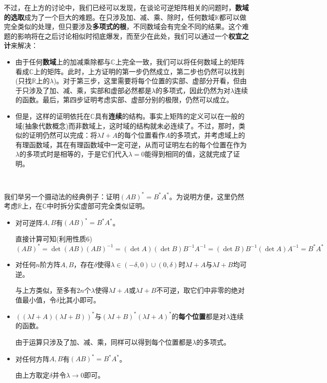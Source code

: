 \documentclass[a4paper,UTF8,fontset=windows]{ctexart}
\begin{document}
不过，在上方的讨论中，我们已经可以发现，在谈论可逆矩阵相关的问题时，\textbf{数域的选取}成为了一个巨大的难题。在只涉及加、减、乘、除时，任何数域$\mathbb{K}$都可以做完全类似的处理，但只要涉及\textbf{多项式的根}，不同数域会有完全不同的结果。这个难题的影响将在之后讨论相似时彻底爆发，而至少在此处，我们可以通过一个\textbf{权宜之计}来解决：
\begin{itemize}
    \item 由于任何\textbf{数域}上的加减乘除都与$\mathbb{C}$上完全一致，我们可以将任何数域上的矩阵看成$\mathbb{C}$上的矩阵。此时，上方证明的第一步仍然成立，第二步也仍然可以找到(只找$\mathbb{R}$上的$\lambda$)。对于第三步，这里需要将每个位置的实部、虚部分开看，但由于只涉及了加、减、乘，实部和虚部必然都是$\lambda$的多项式，因此仍然为对$\lambda$连续的函数。最后，第四步证明考虑实部、虚部分别的极限，仍然可以成立。

    \item 但是，这样的证明依托在$\mathbb{C}$具有\textbf{连续}的结构。事实上矩阵的定义可以在一般的域(抽象代数概念)而非数域上，这时域的结构就未必连续了。不过，那时，类似的证明仍然可以完成：将$\lambda I+A$的每个位置看作$A$的多项式，并考虑域上的有理函数域，其在有理函数域中一定可逆，从而可证明左右的每个位置在作为$\lambda$的多项式时是相等的，于是它们代入$\lambda=0$能得到相同的值，这就完成了证明。
\end{itemize}

\

我们举另一个摄动法的经典例子：证明$(AB)^*=B^*A^*$。为说明方便，这里仍然考虑$\mathbb{R}$上，在$\mathbb{C}$中时拆分实虚部可完全类似证明。

\begin{itemize}
    \item 对可逆阵$A,B$有$(AB)^*=B^*A^*$。
    
    直接计算可知(利用性质6)
    $$(AB)^*=\det(AB)(AB)^{-1}=(\det A)(\det B)B^{-1}A^{-1}=(\det B)B^{-1}(\det A)A^{-1}=B^*A^*$$

    \item 对任何$n$阶方阵$A,B$，存在$\delta$使得$\lambda\in(-\delta,0)\cup(0,\delta)$时$\lambda I+A$与$\lambda I+B$均可逆。
    
    与上方类似，至多有$2n$个$\lambda$使得$\lambda I+A$或$\lambda I+B$不可逆，取它们中非零的绝对值最小值，令$\delta$比其小即可。

    \item $((\lambda I+A)(\lambda I+B))^*$与$(\lambda I+B)^*(\lambda I+A)^*$的\textbf{每个位置}都是对$\lambda$连续的函数。
    
    由于运算只涉及了加、减、乘，同样可以得到每个位置都是$\lambda$的多项式。

    \item 对任何方阵$A,B$有$(AB)^*=B^*A^*$。
    
    由上方取定$\delta$并令$\lambda\to0$即可。
\end{itemize}
\end{document}
